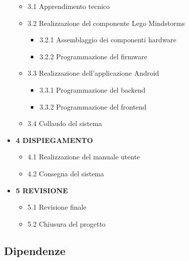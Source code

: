 \documentclass{article}
\begin{document}
\begin{itemize}
    \begin{itemize}
    \item
      3.1 Apprendimento tecnico
    \item
      3.2 Realizzazione del componente Lego Mindstorms
  
      \begin{itemize}
      \item
        3.2.1 Assemblaggio dei componenti hardware
      \item
        3.2.2 Programmazione del firmware
      \end{itemize}
    \item
      3.3 Realizzazione dell'applicazione Android
  
      \begin{itemize}
      \item
        3.3.1 Programmazione del backend
      \item
        3.3.2 Programmazione del frontend
      \end{itemize}
    \item
      3.4 Collaudo del sistema
    \end{itemize}
  \item
    \textbf{4 DISPIEGAMENTO}
  
    \begin{itemize}
    \item
      4.1 Realizzazione del manuale utente
    \item
      4.2 Consegna del sistema
    \end{itemize}
  \item
    \textbf{5 REVISIONE}
  
    \begin{itemize}
    \item
      5.1 Revisione finale
    \item
      5.2 Chiusura del progetto
    \end{itemize}
  \end{itemize}
  
  
  \subsection{Dipendenze}
  
\end{document}
